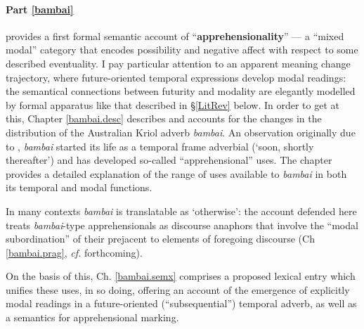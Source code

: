 \documentclass[12pt,dvipsnames]{report}
\begin{document}
\paragraph{Part \ref{bambai}} provides a first formal semantic account of ``\textbf{apprehensionality}'' --- a ``mixed modal'' category that encodes possibility and negative affect with respect to some described eventuality. I pay particular attention to an apparent meaning change trajectory, where future-oriented temporal expressions develop modal readings: the semantical connections between futurity and modality are elegantly modelled by formal apparatus like that described in \S \ref{LitRev} below. In order to get at this, Chapter \ref{bambai.desc} describes and accounts for the changes in the distribution of the Australian Kriol adverb \textit{bambai}. An observation originally due to \citet{Angelo2016,Angelo2018}, \textit{bambai} started its life as a temporal frame adverbial (`soon, shortly thereafter') and has developed so-called ``apprehensional'' uses. The chapter provides a detailed explanation of the range of uses available to \textit{bambai} in both its temporal and modal functions. 

In many contexts \textit{bambai} is translatable as `otherwise': the account defended here treats \textit{bambai}-type apprehensionals as discourse anaphors that involve the ``modal subordination'' of their prejacent to elements of foregoing discourse (Ch \ref{bambai.prag}, \textit{cf.} \citet{PhilKotek} forthcoming).

On the basis of this, Ch. \ref{bambai.semx} comprises a proposed lexical entry which unifies these uses, in so doing, offering an account of the emergence of explicitly modal readings in a future-oriented (``subsequential'') temporal adverb, as well as a semantics for apprehensional marking.%
\end{document}

